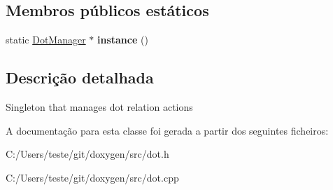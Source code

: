 \subsection*{Membros públicos estáticos}
\begin{DoxyCompactItemize}
\item 
\hypertarget{class_dot_manager_a55f157cd5688aec166be06dd47a99e32}{static \hyperlink{class_dot_manager}{Dot\-Manager} $\ast$ {\bfseries instance} ()}\label{class_dot_manager_a55f157cd5688aec166be06dd47a99e32}

\end{DoxyCompactItemize}


\subsection{Descrição detalhada}
Singleton that manages dot relation actions 

A documentação para esta classe foi gerada a partir dos seguintes ficheiros\-:\begin{DoxyCompactItemize}
\item 
C\-:/\-Users/teste/git/doxygen/src/dot.\-h\item 
C\-:/\-Users/teste/git/doxygen/src/dot.\-cpp\end{DoxyCompactItemize}
